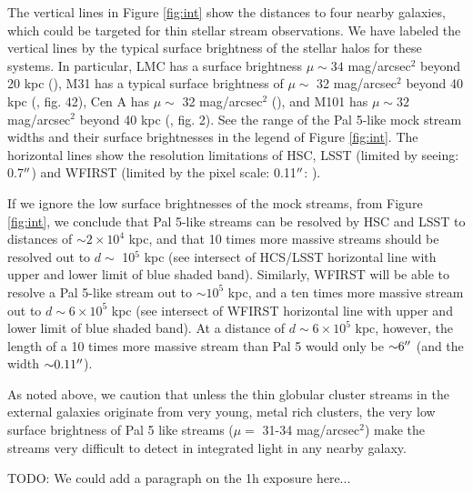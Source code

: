 \documentclass[twocolumn]{aastex62}
\newcommand{\todo}[1]{{\color{red} TODO: #1}}
\begin{document}
The vertical lines in Figure \ref{fig:int} show the distances to four nearby galaxies, which could be targeted for thin stellar stream observations. We have labeled the vertical lines by the typical surface brightness of the stellar halos for these systems. In particular, LMC has a surface brightness $\mu \sim 34$ mag/arcsec$^2$ beyond 20 kpc (\citealt{nidever18}), M31 has a typical surface brightness of  $\mu \sim$ 32 mag/arcsec$^2$ beyond 40 kpc (\citealt{ibata07}, fig. 42), Cen A has  $\mu \sim $ 32 mag/arcsec$^2$ (\citealt{crno16}), and M101 has  $\mu \sim 32 $ mag/arcsec$^2$ beyond 40 kpc (\citealt{dokkum14}, fig. 2). See the range of the Pal 5-like mock stream widths and their surface brightnesses in the legend of Figure \ref{fig:int}. The horizontal lines show the resolution limitations of HSC, LSST (limited by seeing: 0.7$\mbox{$^{\prime\prime}$}$) and WFIRST (limited by the pixel scale: 0.11$\mbox{$^{\prime\prime}$}$: \citealt{spergel13}). 

If we ignore the low surface brightnesses of the mock streams, from Figure \ref{fig:int}, we conclude that Pal 5-like streams can be resolved by HSC and LSST to distances of ${\sim} 2\times 10^4$ kpc, and that 10 times more massive streams should be resolved out to $d \sim$ 10$^5$ kpc (see intersect of HCS/LSST horizontal line with upper and lower limit of blue shaded band). Similarly, WFIRST will be able to resolve a Pal 5-like stream out to ${\sim} 10^5$ kpc, and a ten times more massive stream out to $d \sim 6 \times 10^5$ kpc (see intersect of WFIRST horizontal line with upper and lower limit of blue shaded band). At a distance of $d \sim 6 \times 10^5$ kpc, however, the length of a 10 times more massive stream than Pal 5 would only be ${\sim} 6 \mbox{$^{\prime\prime}$}$ (and the width ${\sim} 0.11\mbox{$^{\prime\prime}$}$). 

As noted above, we caution that unless the thin globular cluster streams in the external galaxies originate from very young, metal rich clusters, the very low surface brightness of Pal 5 like streams ($\mu =$ 31-34 mag/arcsec$^2$) make the streams very difficult to detect in integrated light in any nearby galaxy.

\todo{We could add a paragraph on the 1h exposure here...}
\end{document}

